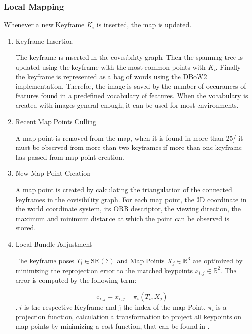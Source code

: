 	\subsubsection{Local Mapping}
	
	Whenever a new Keyframe $K_i$ is inserted, the map is updated. 
	
	
	\begin{enumerate}
	\item{Keyframe Insertion} \label{bagofword}
	
	The keyframe is inserted in the covisibility graph. Then the spanning tree
	is updated using the keyframe with the most common points with $K_i$.
	Finally the keyframe is represented as a bag of words using the DBoW2 implementation. 
	Therefor, the image is saved by the number of occurances of features found in a predefined
	vocabulary of features. When the vocabulary is created with images general enough, 
	it can be used for most environments.

	
	\item{Recent Map Points Culling}
	
	A map point is removed from the map, when it is found in more than 
	25/%
	it must be observed from more than two keyframes if more than one keyframe 
	has passed from map point creation. 
	
	\item{New Map Point Creation}
	
	A map point is created by calculating the triangulation of the connected
	keyframes in the covisibility graph. For each map point, the 3D coordinate 
	in the world coordinate system, its ORB descriptor, the viewing direction, 
	the maximum and minimum distance at which the point can be observed is stored. 
	
	\item{Local Bundle Adjustment}
	
	The keyframe poses $T_i \in \text{SE}(3)$ and Map Points $X_j \in \mathbb{R}^{3}$ 
	are optimized by minimizing the reprojection error to the matched keypoints $x_{i,j} \in \mathbb{R}^{2}$.
	The error is computed by the following term:
	
	$$ e_{i,j} = x_{i,j} - \pi_i\left(T_i, X_j\right) $$. 
	$i$ is the respective Keyframe and j the index of the map Point. 
	$\pi_i$ is a projection function, calculation a transformation 
	to project all keypoints on map points by minimizing a cost function, that
	can be found in \cite{ba}.


\end{enumerate}
